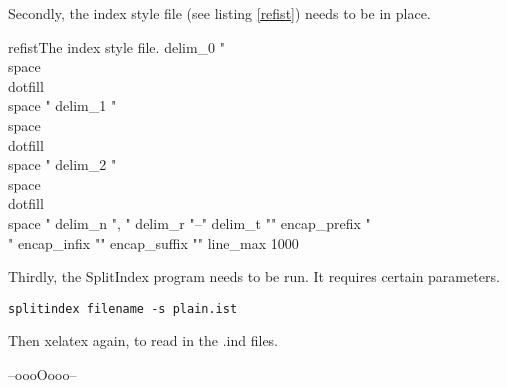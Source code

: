 Secondly, the index style file (see listing \ref{refist}) needs to be in place.

\begin{dov}{refist}{The index style file.}
delim_0 "\\space\\dotfill\\space "
delim_1 "\\space\\dotfill\\space "
delim_2 "\\space\\dotfill\\space "
delim_n ", "
delim_r "--"
delim_t ""
encap_prefix "\\"
encap_infix "{"
encap_suffix "}"
line_max 1000
\end{dov}


Thirdly, the SplitIndex program needs to be run. It requires certain parameters.

\colorbox{yellow!50!green!20}{\texttt{splitindex filename -s plain.ist}}

Then xelatex again, to read in the .ind files.
\bigskip


\bigskip
\bigskip
\hfill --oooOooo--\hfill\ 




